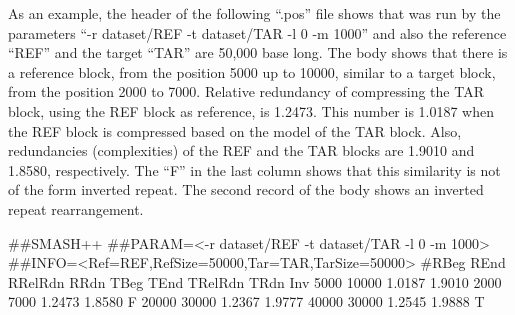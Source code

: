 \documentclass[a4paper,9pt]{extarticle}
\begin{document}
As an example, the header of the following ``.pos'' file shows that \smashpp was run by the parameters ``-r dataset/REF -t dataset/TAR -l 0 -m 1000'' and also the reference ``REF'' and the target ``TAR'' are 50,000 base long. The body shows that there is a reference block, from the position 5000 up to 10000, similar to a target block, from the position 2000 to 7000. Relative redundancy of compressing the TAR block, using the REF block as reference, is 1.2473. This number is 1.0187 when the REF block is compressed based on the model of the TAR block. Also, redundancies (complexities) of the REF and the TAR blocks are 1.9010 and 1.8580, respectively. The ``F'' in the last column shows that this similarity is not of the form inverted repeat. The second record of the body shows an inverted repeat rearrangement.
\begin{code}[style=bash]
##SMASH++
##PARAM=<-r dataset/REF -t dataset/TAR -l 0 -m 1000>
##INFO=<Ref=REF,RefSize=50000,Tar=TAR,TarSize=50000>
#RBeg  REnd   RRelRdn  RRdn    TBeg   TEnd   TRelRdn  TRdn    Inv
5000   10000  1.0187   1.9010  2000   7000   1.2473   1.8580  F
20000  30000  1.2367   1.9777  40000  30000  1.2545   1.9888  T
\end{code}

\end{document}
